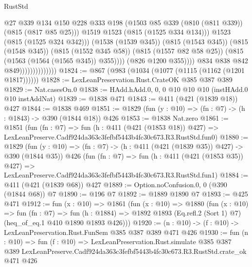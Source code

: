 \begin{lexlean}{RustStd}
\begin{coremodule}
                                              @27
                                              @339
                                              @134
                                              @150
                                              @228
                                              @333
                                              @198
                                              (@1503
                                                @85
                                                @339
                                                (@810 (@811 @339))
                                                (@815 (@817 @85 @25)))
                                              @1519
                                              @1523
                                              (@815 (@1525 @334 @134)))
                                            @1523
                                            (@815 (@1525 @324 @342)))
                                          (@1538 (@1539 @345))
                                          (@815 (@1543 @345))
                                          (@815 (@1548 @345))
                                          (@815 (@1552 @345 @58))
                                          (@815 (@1557 @82 @58 @25))
                                          (@815 (@1563 (@1564 (@1565 @345)) @355))))
                                      (@826 @1200 @355))))
                                @834
                                @838
                                @842
                                @849))))))))))))))
@1824 := @867 (@983 (@1034 (@1077 (@1115 (@1162 (@1201 @1817))))))
@1828 := LexLeanPreservation.Rust.CrateOK @385 @387 @389
@1829 := Nat.casesOn.{0}
@1838 := HAdd.hAdd.{0, 0, 0} @10 @10 @10 (instHAdd.{0} @10 instAddNat)
@1839 := @1838 @471
@1843 := @411 (@421 (@1839 @18)) @427
@1844 := @1838 @469
@1851 := @1829 (fun (y : @10) => (fn : @7) -> (h : @1843) -> @390 (@1844 @18)) @426
@1853 := @1838 Nat.zero
@1861 := @1851
    (fun (fn : @7) =>
    fun (h : @411 (@421 (@1853 @18)) @427) =>
    LexLeanPreserve.Cadf924da363c3fefbf5443b4fc30c673.R3.RustStd.fun0)
@1880 := @1829
    (fun (y : @10) => (fn : @7) -> (h : @411 (@421 (@1839 @35)) @427) -> @390 (@1844 @35))
    @426
    (fun (fn : @7) =>
    fun (h : @411 (@421 (@1853 @35)) @427) =>
    LexLeanPreserve.Cadf924da363c3fefbf5443b4fc30c673.R3.RustStd.fun1)
@1884 := @411 (@421 (@1839 @68)) @427
@1889 := Option.noConfusion.{0, 0} (@390 (@1844 @68)) @7
@1890 := @196 @7
@1892 := @1889 @1890 @7
@1893 := @425 @471
@1912 := fun (x : @10) =>
  @1861
    (fun (x : @10) =>
    @1880
      (fun (x : @10) =>
      fun (fn : @7) =>
      fun (h : @1884) =>
      @1892 @1893 (Eq.refl.{2} (Sort 1) @7) (heq_of_eq.{1} @410 @1890 @1893 @426)))
@1920 := (n : @10) -> (f : @10) -> LexLeanPreservation.Rust.FunSem @385 @387 @389 @471 @426
@1930 := fun (n : @10) =>
  fun (f : @10) =>
  LexLeanPreservation.Rust.simulate
    @385
    @387
    @389
    LexLeanPreserve.Cadf924da363c3fefbf5443b4fc30c673.R3.RustStd.crate_ok
    @471
    @426
\end{coremodule}
\end{lexlean}
